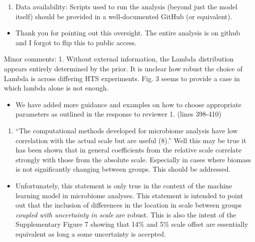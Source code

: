 \documentclass[
]{article}
\providecommand{\tightlist}{%
  \setlength{\itemsep}{0pt}\setlength{\parskip}{0pt}}
\begin{document}
\begin{enumerate}
\def\labelenumi{\arabic{enumi}.}
\setcounter{enumi}{4}
\tightlist
\item
  Data availability: Scripts used to run the analysis (beyond just the
  model itself) should be provided in a well-documented GitHub (or
  equivalent).
\end{enumerate}

\begin{itemize}
\tightlist
\item
  Thank you for pointing out this oversight. The entire analysis is on
  github and I forgot to flip this to public access.
\end{itemize}

Minor comments: 1. Without external information, the Lambda distribution
appears entirely determined by the prior. It is unclear how robust the
choice of Lambda is across differing HTS experiments. Fig. 3 seems to
provide a case in which lambda alone is not enough.

\begin{itemize}
\tightlist
\item
  We have added more guidance and examples on how to choose appropriate
  parameters as outlined in the response to reviewer 1. (lines 398-410)
\end{itemize}

\begin{enumerate}
\def\labelenumi{\arabic{enumi}.}
\setcounter{enumi}{1}
\tightlist
\item
  ``The computational methods developed for microbiome analysis have low
  correlation with the actual scale but are useful (8).'' Well this may
  be true it has been shown that in general coefficients from the
  relative scale correlate strongly with those from the absolute scale.
  Especially in cases where biomass is not significantly changing
  between groups. This should be addressed.
\end{enumerate}

\begin{itemize}
\tightlist
\item
  Unfortunately, this statement is only true in the context of the
  machine learning model in microbiome analyses. This statement is
  intended to point out that the inclusion of differences in the
  location in scale between groups \emph{coupled with uncertainty in
  scale} are robust. This is also the intent of the Supplementary Figure
  7 showing that 14\% and 5\% scale offset are essentially equivalent as
  long a some uncertainty is accepted.
\end{itemize}
\end{document}
